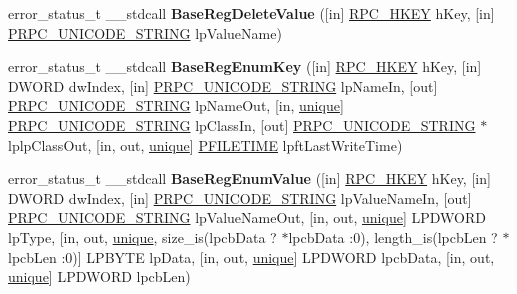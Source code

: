 \begin{DoxyCompactItemize}
error\+\_\+status\+\_\+t \+\_\+\+\_\+stdcall {\bfseries Base\+Reg\+Delete\+Value} (\mbox{[}in\mbox{]} \hyperlink{interfacevoid}{R\+P\+C\+\_\+\+H\+K\+EY} h\+Key, \mbox{[}in\mbox{]} \hyperlink{struct___r_p_c___u_n_i_c_o_d_e___s_t_r_i_n_g}{P\+R\+P\+C\+\_\+\+U\+N\+I\+C\+O\+D\+E\+\_\+\+S\+T\+R\+I\+NG} lp\+Value\+Name)
\item 
\mbox{\label{interfacewinreg_a075a322c3c6abf7e52500bde11962722}} 
error\+\_\+status\+\_\+t \+\_\+\+\_\+stdcall {\bfseries Base\+Reg\+Enum\+Key} (\mbox{[}in\mbox{]} \hyperlink{interfacevoid}{R\+P\+C\+\_\+\+H\+K\+EY} h\+Key, \mbox{[}in\mbox{]} D\+W\+O\+RD dw\+Index, \mbox{[}in\mbox{]} \hyperlink{struct___r_p_c___u_n_i_c_o_d_e___s_t_r_i_n_g}{P\+R\+P\+C\+\_\+\+U\+N\+I\+C\+O\+D\+E\+\_\+\+S\+T\+R\+I\+NG} lp\+Name\+In, \mbox{[}out\mbox{]} \hyperlink{struct___r_p_c___u_n_i_c_o_d_e___s_t_r_i_n_g}{P\+R\+P\+C\+\_\+\+U\+N\+I\+C\+O\+D\+E\+\_\+\+S\+T\+R\+I\+NG} lp\+Name\+Out, \mbox{[}in, \hyperlink{interfaceunique}{unique}\mbox{]} \hyperlink{struct___r_p_c___u_n_i_c_o_d_e___s_t_r_i_n_g}{P\+R\+P\+C\+\_\+\+U\+N\+I\+C\+O\+D\+E\+\_\+\+S\+T\+R\+I\+NG} lp\+Class\+In, \mbox{[}out\mbox{]} \hyperlink{struct___r_p_c___u_n_i_c_o_d_e___s_t_r_i_n_g}{P\+R\+P\+C\+\_\+\+U\+N\+I\+C\+O\+D\+E\+\_\+\+S\+T\+R\+I\+NG} $\ast$lplp\+Class\+Out, \mbox{[}in, out, \hyperlink{interfaceunique}{unique}\mbox{]} \hyperlink{struct___f_i_l_e_t_i_m_e}{P\+F\+I\+L\+E\+T\+I\+ME} lpft\+Last\+Write\+Time)
\item 
\mbox{\label{interfacewinreg_a71203c76bf4aecbd6ad044fa4f6fb923}} 
error\+\_\+status\+\_\+t \+\_\+\+\_\+stdcall {\bfseries Base\+Reg\+Enum\+Value} (\mbox{[}in\mbox{]} \hyperlink{interfacevoid}{R\+P\+C\+\_\+\+H\+K\+EY} h\+Key, \mbox{[}in\mbox{]} D\+W\+O\+RD dw\+Index, \mbox{[}in\mbox{]} \hyperlink{struct___r_p_c___u_n_i_c_o_d_e___s_t_r_i_n_g}{P\+R\+P\+C\+\_\+\+U\+N\+I\+C\+O\+D\+E\+\_\+\+S\+T\+R\+I\+NG} lp\+Value\+Name\+In, \mbox{[}out\mbox{]} \hyperlink{struct___r_p_c___u_n_i_c_o_d_e___s_t_r_i_n_g}{P\+R\+P\+C\+\_\+\+U\+N\+I\+C\+O\+D\+E\+\_\+\+S\+T\+R\+I\+NG} lp\+Value\+Name\+Out, \mbox{[}in, out, \hyperlink{interfaceunique}{unique}\mbox{]} L\+P\+D\+W\+O\+RD lp\+Type, \mbox{[}in, out, \hyperlink{interfaceunique}{unique}, size\+\_\+is(lpcb\+Data ? $\ast$lpcb\+Data \+:0), length\+\_\+is(lpcb\+Len ? $\ast$lpcb\+Len \+:0)\mbox{]} L\+P\+B\+Y\+TE lp\+Data, \mbox{[}in, out, \hyperlink{interfaceunique}{unique}\mbox{]} L\+P\+D\+W\+O\+RD lpcb\+Data, \mbox{[}in, out, \hyperlink{interfaceunique}{unique}\mbox{]} L\+P\+D\+W\+O\+RD lpcb\+Len)

\end{DoxyCompactItemize}
